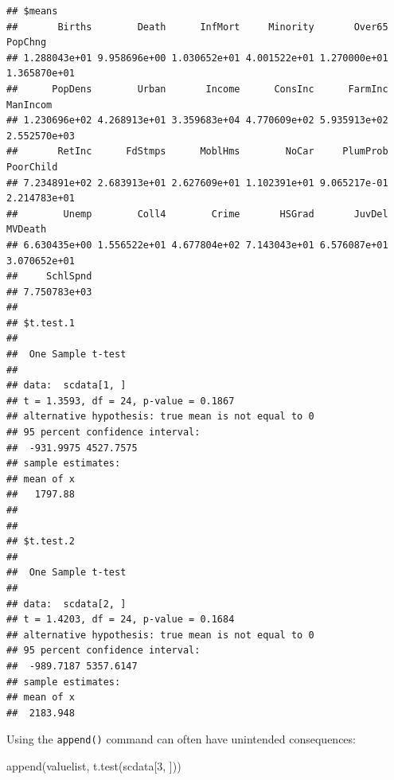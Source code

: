 \documentclass[
]{book}
\newenvironment{Shaded}{\begin{snugshade}}{\end{snugshade}}
\newcommand{\DecValTok}[1]{\textcolor[rgb]{0.00,0.00,0.81}{#1}}
\newcommand{\FloatTok}[1]{\textcolor[rgb]{0.00,0.00,0.81}{#1}}
\newcommand{\FunctionTok}[1]{\textcolor[rgb]{0.00,0.00,0.00}{#1}}
\newcommand{\NormalTok}[1]{#1}
\newcommand{\OtherTok}[1]{\textcolor[rgb]{0.56,0.35,0.01}{#1}}
\newcommand{\SpecialCharTok}[1]{\textcolor[rgb]{0.00,0.00,0.00}{#1}}
\begin{document}
\begin{Shaded}
\end{Shaded}

\begin{verbatim}
## $means
##       Births        Death      InfMort     Minority       Over65      PopChng 
## 1.288043e+01 9.958696e+00 1.030652e+01 4.001522e+01 1.270000e+01 1.365870e+01 
##      PopDens        Urban       Income      ConsInc      FarmInc     ManIncom 
## 1.230696e+02 4.268913e+01 3.359683e+04 4.770609e+02 5.935913e+02 2.552570e+03 
##       RetInc      FdStmps      MoblHms        NoCar     PlumProb    PoorChild 
## 7.234891e+02 2.683913e+01 2.627609e+01 1.102391e+01 9.065217e-01 2.214783e+01 
##        Unemp        Coll4        Crime       HSGrad       JuvDel      MVDeath 
## 6.630435e+00 1.556522e+01 4.677804e+02 7.143043e+01 6.576087e+01 3.070652e+01 
##     SchlSpnd 
## 7.750783e+03 
## 
## $t.test.1
## 
##  One Sample t-test
## 
## data:  scdata[1, ]
## t = 1.3593, df = 24, p-value = 0.1867
## alternative hypothesis: true mean is not equal to 0
## 95 percent confidence interval:
##  -931.9975 4527.7575
## sample estimates:
## mean of x 
##   1797.88 
## 
## 
## $t.test.2
## 
##  One Sample t-test
## 
## data:  scdata[2, ]
## t = 1.4203, df = 24, p-value = 0.1684
## alternative hypothesis: true mean is not equal to 0
## 95 percent confidence interval:
##  -989.7187 5357.6147
## sample estimates:
## mean of x 
##  2183.948
\end{verbatim}

Using the \texttt{append()} command can often have unintended consequences:

\begin{Shaded}
\begin{Highlighting}[]
\FunctionTok{append}\NormalTok{(valuelist, }\FunctionTok{t.test}\NormalTok{(scdata[}\DecValTok{3}\NormalTok{, ]))}
\end{Highlighting}
\end{Shaded}
\end{document}
